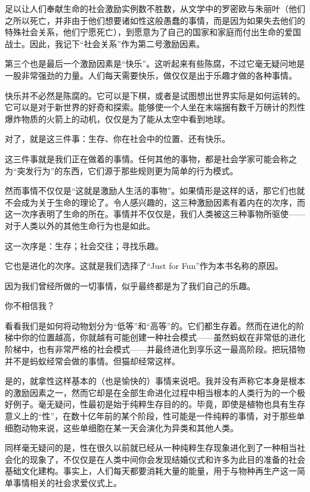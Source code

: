 足以让人们奉献生命的社会激励实例数不胜数，从文学中的罗密欧与朱丽叶（他们之所以死亡，并非由于他们想要诸如性这般愚蠢的事情，而是因为如果失去他们的特殊社会关系，他们宁愿死亡），到愿意为了自己的国家和家庭而付出生命的爱国战士。因此，我记下“社会关系”作为第二号激励因素。

第三个也是最后一个激励因素是“快乐”。这听起来有些陈腐，不过它毫无疑问地是一股非常强劲的力量。人们每天需要快乐，做仅仅是出于乐趣才做的各种事情。

快乐并不必然是陈腐的。它可以是下棋，或者是试图想出世界实际是如何运转的。它可以是对于新世界的好奇和探索。能够使一个人坐在末端捆有数千万磅计的烈性爆炸物质的火箭上的动机，仅仅是为了能从太空中看到地球。

对了，就是这三件事：生存、你在社会中的位置、还有快乐。

这三件事就是我们正在做着的事情。任何其他的事物，都是社会学家可能会称之为“突发行为”的东西，它们源于那些规则更为简单的行为模式。

然而事情不仅仅是“这就是激励人生活的事物”。如果情形是这样的话，那它们也就不会成为关于生命的理论了。令人感兴趣的，这三种激励因素有着内在的次序，而这一次序表明了生命的所在。事情并不仅仅是，我们人类被这三种事物所驱使——对于人类以外的其他生命行为也是如此。

这一次序是：生存；社会交往；寻找乐趣。

它也是进化的次序。这就是我们选择了“Just for Fun”作为本书名称的原因。

因为我们曾经所做的一切事情，似乎最终都是为了我们自己的乐趣。

你不相信我？

看看我们是如何将动物划分为“低等”和“高等”的。它们都生存着。然而在进化的阶梯中你的位置越高，你就越有可能创建一种社会模式——虽然蚂蚁在非常低的进化阶梯中，也有非常严格的社会模式——并最终进化到享乐这一最高阶段。把玩猎物并不是蚂蚁经常会做的事情。但猫却经常这样。

是的，就拿性这样基本的（也是愉快的）事情来说吧。我并没有声称它本身是根本的激励因素之一，然而它却是在全部生命进化过程中相当根本的人类行为的一个极好例子。毫无疑问，性最初是始于纯粹生存目的的。毕竟，即使是植物也具有生存意义上的“性”，在数十亿年前的某个阶段，性可能是一件纯粹的事情，对于那些单细胞动物来说，这些单细胞在某一天会演化为异类和其他人类。

同样毫无疑问的是，性在很久以前就已经从一种纯粹生存现象进化到了一种相当社会化的现象了，不仅仅是在人类中间你会发现结婚仪式和许多为此目的准备的社会基础文化建构。事实上，人们每天都要消耗大量的能量，用于与物种再生产这一简单事情相关的社会求爱仪式上。

